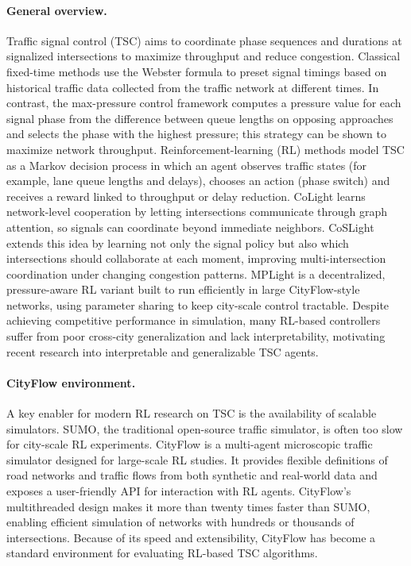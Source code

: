 \paragraph{General overview.}
Traffic signal control (TSC) aims to coordinate phase sequences and durations at signalized intersections to maximize throughput and reduce congestion. Classical fixed-time methods use the Webster formula\cite{webster} to preset signal timings based on historical traffic data collected from the traffic network at different
times. In contrast, the max-pressure control framework\cite{MERCADER2020275} computes a pressure value for each signal phase from the difference between queue lengths on opposing approaches and selects the phase with the highest pressure; this strategy can be shown to maximize network throughput. Reinforcement-learning (RL) methods model TSC as a Markov decision process in which an agent observes traffic states (for example, lane queue lengths and delays), chooses an action (phase switch) and receives a reward linked to throughput or delay reduction. CoLight\cite{10.1145/3357384.3357902} learns network-level cooperation by letting intersections communicate through graph attention, so signals can coordinate beyond immediate neighbors. CoSLight\cite{ruan2024coslightcooptimizingcollaboratorselection} extends this idea by learning not only the signal policy but also which intersections should collaborate at each moment, improving multi-intersection coordination under changing congestion patterns. MPLight\cite{Chen_Wei_Xu_Zheng_Yang_Xiong_Xu_Li_2020} is a decentralized, pressure-aware RL variant built to run efficiently in large CityFlow\cite{tang2019cityflowcityscalebenchmarkmultitarget}-style networks, using parameter sharing to keep city-scale control tractable. Despite achieving competitive performance in simulation, many RL-based controllers suffer from poor cross-city generalization and lack interpretability, motivating recent research into interpretable and generalizable TSC agents.

\paragraph{CityFlow environment.}
A key enabler for modern RL research on TSC is the availability of scalable simulators. SUMO\cite{SUMO2018}, the traditional open-source traffic simulator, is often too slow for city-scale RL experiments. CityFlow\cite{tang2019cityflowcityscalebenchmarkmultitarget} is a multi-agent microscopic traffic simulator designed for large-scale RL studies. It provides flexible definitions of road networks and traffic flows from both synthetic and real-world data and exposes a user-friendly API for interaction with RL agents. CityFlow's multithreaded design makes it more than twenty times faster than SUMO, enabling efficient simulation of networks with hundreds or thousands of intersections. Because of its speed and extensibility, CityFlow has become a standard environment for evaluating RL-based TSC algorithms.

